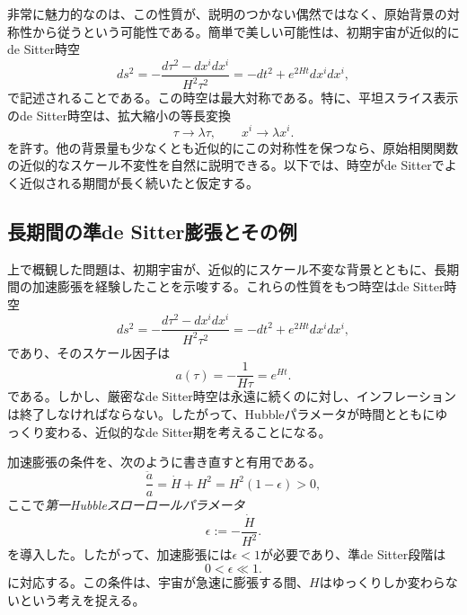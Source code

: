 \documentclass[a4paper,11pt,oneside]{article}
\theoremstyle{definition}
\numberwithin{equation}{section}
\begin{document}
非常に魅力的なのは、この性質が、説明のつかない偶然ではなく、原始背景の対称性から従うという可能性である。簡単で美しい可能性は、初期宇宙が近似的にde Sitter時空
\begin{equation}
ds^2
=
-\frac{d\tau^2-dx^i dx^i}{H^2\tau^2}
=
-dt^2+e^{2Ht}dx^i dx^i ,
\end{equation}
で記述されることである。この時空は最大対称である。特に、平坦スライス表示のde Sitter時空は、拡大縮小の等長変換
\begin{equation}
\tau \to \lambda \tau,
\qquad
x^i \to \lambda x^i .
\end{equation}
を許す。他の背景量も少なくとも近似的にこの対称性を保つなら、原始相関関数の近似的なスケール不変性を自然に説明できる。以下では、時空がde Sitterでよく近似される期間が長く続いたと仮定する。






\subsection{長期間の準de Sitter膨張とその例}



上で概観した問題は、初期宇宙が、近似的にスケール不変な背景とともに、長期間の加速膨張を経験したことを示唆する。これらの性質をもつ時空はde Sitter時空
\begin{equation}
ds^2
=
-\frac{d\tau^2-dx^i dx^i}{H^2\tau^2}
=
-dt^2+e^{2Ht}dx^i dx^i ,
\end{equation}
であり、そのスケール因子は
\begin{equation}
a(\tau)=-\frac{1}{H\tau}=e^{Ht} .
\end{equation}
である。しかし、厳密なde Sitter時空は永遠に続くのに対し、インフレーションは終了しなければならない。したがって、Hubbleパラメータが時間とともにゆっくり変わる、近似的なde Sitter期を考えることになる。



加速膨張の条件を、次のように書き直すと有用である。
\begin{equation}
\frac{\ddot a}{a}=\dot H+H^2=H^2(1-\epsilon)>0 ,
\end{equation}
ここで\textit{第一Hubbleスローロールパラメータ}
\begin{equation}
\epsilon := -\frac{\dot H}{H^2} .
\end{equation}
を導入した。したがって、加速膨張には\(\epsilon<1\)が必要であり、準de Sitter段階は
\begin{equation}
0<\epsilon\ll 1 .
\end{equation}
に対応する。この条件は、宇宙が急速に膨張する間、\(H\)はゆっくりしか変わらないという考えを捉える。
\end{document}
